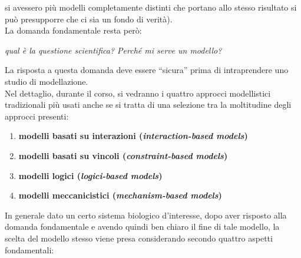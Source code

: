 \documentclass[a4paper,12pt, oneside]{book}
\begin{document}
si avessero più modelli completamente distinti che portano allo stesso risultato
si può presupporre che ci sia un fondo di verità). \\
La domanda fondamentale resta però:
\begin{center}
  \textit{qual è la questione scientifica? Perché mi serve un modello?}
\end{center}
La risposta a questa domanda deve essere ``sicura'' prima di intraprendere uno
studio di modellazione.\\
Nel dettaglio, durante il corso, si vedranno i quattro approcci modellistici
tradizionali più usati anche se si tratta di una selezione tra la moltitudine
degli approcci presenti:
\begin{enumerate}
  \item \textbf{modelli basati su interazioni (\textit{interaction-based
      models})}
  \item \textbf{modelli basati su vincoli (\textit{constraint-based
      models})}
  \item \textbf{modelli logici (\textit{logici-based models})}
  \item \textbf{modelli meccanicistici (\textit{mechanism-based models})}
\end{enumerate}
In generale dato un certo sistema biologico d'interesse, dopo aver risposto alla
domanda fondamentale e avendo quindi ben chiaro il fine di tale modello, la
scelta del modello stesso viene presa considerando secondo quattro aspetti
fondamentali:
\end{document}
